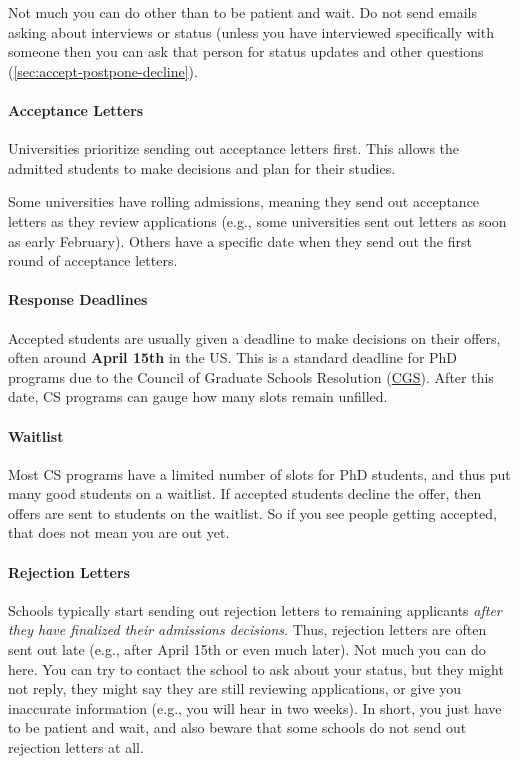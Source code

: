 \documentclass[oneside,11pt,dvipsnames]{book}
\begin{document}
Not much you can do other than to be patient and wait. Do not send emails asking about interviews or status (unless you have interviewed specifically with someone then you can ask that person for status updates and other questions (\autoref{sec:accept-postpone-decline}).



\paragraph{Acceptance Letters} Universities prioritize sending out acceptance letters first. This allows the admitted students to make decisions and plan for their studies.

Some universities have rolling admissions, meaning they send out acceptance letters as they review applications (e.g., some universities sent out letters as soon as early February). Others have a specific date when they send out the first round of acceptance letters.   

\paragraph{Response Deadlines} Accepted students are usually given a deadline to make decisions on their offers, often around \textbf{April 15th} in the US. This is a standard deadline for PhD programs due to the Council of Graduate Schools Resolution (\href{https://cgsnet.org/wp-content/uploads/2024/01/CGS_April15_Resolution_Jan312024.pdf}{CGS}). After this date, CS programs can gauge how many slots remain unfilled.

\paragraph{Waitlist} Most CS programs have a limited number of slots for PhD students, and thus put many good students on a waitlist.  If accepted students decline the offer, then offers are sent to students on the waitlist. So if you see people getting accepted, that does not mean you are out yet.

\paragraph{Rejection Letters} Schools typically start sending out rejection letters to remaining applicants \emph{after they have finalized their admissions decisions}. Thus, rejection letters are often sent out late (e.g., after April 15th or even much later). Not much you can do here. You can try to contact the school to ask about your status, but they might not reply, they might say they are still reviewing applications, or give you inaccurate information (e.g., you will hear in two weeks). In short, you just have to be patient and wait, and also beware that some schools do not send out rejection letters at all.
\end{document}
